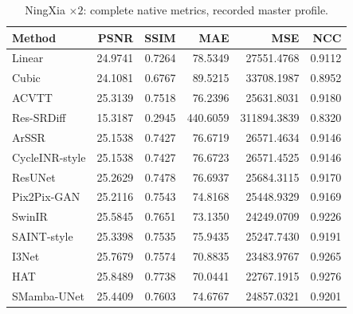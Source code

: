 \begin{table}[t]\centering\small
\caption{NingXia $\times2$: complete native metrics, recorded master profile.}
\begin{tabular}{lrrrrr}\toprule Method&PSNR&SSIM&MAE&MSE&NCC\\\midrule
Linear & 24.9741 & 0.7264 & 78.5349 & 27551.4768 & 0.9112\\
Cubic & 24.1081 & 0.6767 & 89.5215 & 33708.1987 & 0.8952\\
ACVTT & 25.3139 & 0.7518 & 76.2396 & 25631.8031 & 0.9180\\
Res-SRDiff & 15.3187 & 0.2945 & 440.6059 & 311894.3839 & 0.8320\\
ArSSR & 25.1538 & 0.7427 & 76.6719 & 26571.4634 & 0.9146\\
CycleINR-style & 25.1538 & 0.7427 & 76.6723 & 26571.4525 & 0.9146\\
ResUNet & 25.2629 & 0.7478 & 76.6937 & 25684.3115 & 0.9170\\
Pix2Pix-GAN & 25.2116 & 0.7543 & 74.8168 & 25448.9329 & 0.9169\\
SwinIR & 25.5845 & 0.7651 & 73.1350 & 24249.0709 & 0.9226\\
SAINT-style & 25.3398 & 0.7535 & 75.9435 & 25247.7430 & 0.9191\\
I3Net & 25.7679 & 0.7574 & 70.8835 & 23483.9767 & 0.9265\\
HAT & 25.8489 & 0.7738 & 70.0441 & 22767.1915 & 0.9276\\
SMamba-UNet & 25.4409 & 0.7603 & 74.6767 & 24857.0321 & 0.9201\\
\bottomrule\end{tabular}\end{table}
